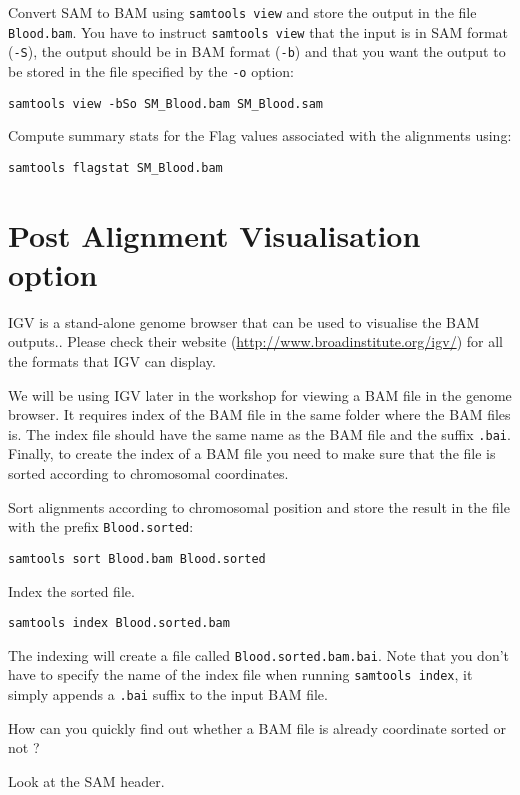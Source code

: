 \begin{steps}
Convert SAM to BAM using \texttt{samtools view} and store the output in the file
\texttt{Blood.bam}. You have to instruct \texttt{samtools view} that the input is in SAM
format (\texttt{-S}), the output should be in BAM format (\texttt{-b}) and that
you want the output to be stored in the file specified by the \texttt{-o}
option:

\begin{lstlisting}
samtools view -bSo SM_Blood.bam SM_Blood.sam
\end{lstlisting}
\end{steps}

\begin{advanced}
Compute summary stats for the Flag values associated with the alignments using:

\begin{lstlisting}
samtools flagstat SM_Blood.bam
\end{lstlisting}
\end{advanced}

\section{Post Alignment Visualisation option}

\begin{information}
IGV is a stand-alone genome browser that can be used to visualise the BAM outputs.. Please check their website
(\url{http://www.broadinstitute.org/igv/}) for all the formats that IGV can display.
 
We will be using IGV later in the workshop for viewing a BAM file in the genome browser. It requires 
index of the BAM file in the same folder where the BAM files is. The index file
should have the same name as the BAM file and the suffix \texttt{.bai}. Finally, to
create the index of a BAM file you need to make sure that the file is sorted
according to chromosomal coordinates.
\begin{note}
\end{note}

\end{information}


\begin{steps}
Sort alignments according to chromosomal position and store the result in the
file with the prefix \texttt{Blood.sorted}:

\begin{lstlisting}
samtools sort Blood.bam Blood.sorted
\end{lstlisting}

Index the sorted file.

\begin{lstlisting}
samtools index Blood.sorted.bam
\end{lstlisting}

The indexing will create a file called \texttt{Blood.sorted.bam.bai}. Note that
you don't have to specify the name of the index file when running
\texttt{samtools index}, it simply appends a \texttt{.bai} suffix to the input
BAM file.
\end{steps}


\begin{questions}
How can you quickly find out whether a BAM file is already coordinate sorted or not ? 
\begin{answer}
Look at the SAM header.
\end{answer}
\end{questions}



